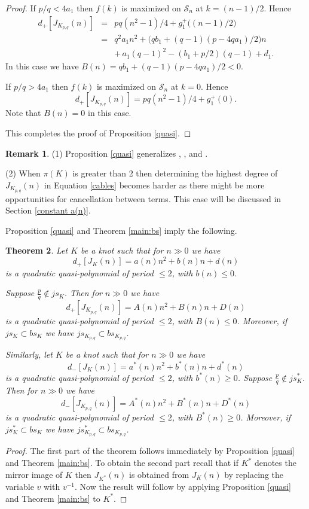 \documentclass[11pt]{amsart}
\newtheorem{theorem}{Theorem}[section]
\theoremstyle{definition}
\newtheorem{remark}[theorem]{Remark}
\newcommand{\K}{{K_{p, q}}}
\def\CS{\mathcal S}
\begin{document}
\begin{proof}
If $p/q <4a_1$ then $f(k)$ is maximized on $\CS_n$ at $k=(n-1)/2$. Hence
\begin{eqnarray*}
d_+[J_{K_{p,q}}(n)] &=& pq(n^2-1)/4+g_1^+ \big( (n-1)/2 \big)\\
&=& q^2a_1n^2+ \big(qb_1+(q-1)(p-4qa_1)/2 \big)n\\
&& + \, a_1(q-1)^2-(b_1+p/2)(q-1)+d_1.
\end{eqnarray*}
In this case we have $B(n) = qb_1+(q-1)(p-4qa_1)/2 < 0$.

If $p/q >4a_1$ then $f(k)$ is maximized on $\CS_n$ at $k=0$. Hence $$d_+[J_{K_{p,q}}(n)]=pq(n^2-1)/4+g^+_1(0).$$
Note that $B(n) = 0$ in this case.

This completes the proof of Proposition \ref{quasi}.
\end{proof}

\begin{remark} (1) Proposition \ref{quasi} generalizes \cite[Lemma 2.2]{RZ}, \cite[Lemma 2.2]{Ru},  \cite[Lemma 3.1]{Tr-AJ-8} and \cite[Lemma 3.2]{Tr}.

(2) When $\pi(K)$ is greater than 2 then determining the highest degree of
 $J_{K_{p,q}}(n)$ in Equation \eqref{cables} becomes harder as there might be more opportunities for cancellation
between terms. This case will be discussed in Section \ref{constant a(n)}.
\end{remark}
 
 Proposition \ref{quasi} and Theorem \ref{main:bs} imply the following.
 
 \begin{theorem}
 \label{thm-quasi}
 Let $K$ be a knot such that for $n \gg 0$ we have
$$
d_+[J_K(n)]=a(n)n^2+b(n)n+d(n)
$$
is a quadratic quasi-polynomial of period $\le 2$, with $b(n) \le 0$. 

Suppose $\frac{p}{q} \notin js_K$. Then for $n \gg 0$ we have
$$d_+[J_{\K}(n)]=A(n)n^2+B(n)n+D(n)$$
is a quadratic quasi-polynomial of period $\le 2$, with $B(n) \le 0$. 
Moreover,  if $js_K \subset bs_K$ we have $js_{\K} \subset bs_{\K}$.

Similarly, let $K$ be a knot such that for $n \gg 0$ we have
$$
d_-[J_K(n)]=a^*(n)n^2+b^*(n)n+d^*(n)
$$
is a quadratic quasi-polynomial of period $\le 2$, with $b^*(n) \ge 0$. 
Suppose $\frac{p}{q} \notin js^*_K$.  
Then for $n \gg 0$ we have
$$d_-[J_{\K}(n)]=A^*(n)n^2+B^*(n)n+D^*(n)$$
is a quadratic quasi-polynomial of period $\le 2$, with $B^*(n) \ge 0$. 
Moreover,  if $js^*_K \subset bs_K$ we have $js^*_{\K} \subset bs_{\K}$.
 \end{theorem}
\begin{proof} The first part of the theorem follows immediately by Proposition  \ref{quasi} and Theorem \ref{main:bs}.
To obtain the second part recall that if ${K^{*}}$ denotes the mirror image of $K$ then
$J_{K^{*}}(n)$ is obtained from $J_K(n)$ by replacing the variable $v$ with $v^{-1}$.
Now the result will follow by applying Proposition \ref{quasi} and Theorem \ref{main:bs} to $K^{*}$.
\end{proof}
 
\end{document}
